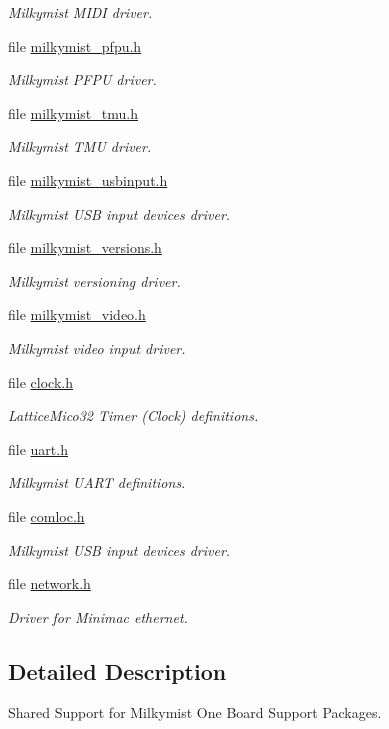 \begin{DoxyCompactItemize}
\begin{DoxyCompactList}\small\item\em Milkymist M\+I\+DI driver. \end{DoxyCompactList}\item 
file \mbox{\hyperlink{milkymist__pfpu_8h}{milkymist\+\_\+pfpu.\+h}}
\begin{DoxyCompactList}\small\item\em Milkymist P\+F\+PU driver. \end{DoxyCompactList}\item 
file \mbox{\hyperlink{milkymist__tmu_8h}{milkymist\+\_\+tmu.\+h}}
\begin{DoxyCompactList}\small\item\em Milkymist T\+MU driver. \end{DoxyCompactList}\item 
file \mbox{\hyperlink{milkymist__usbinput_8h}{milkymist\+\_\+usbinput.\+h}}
\begin{DoxyCompactList}\small\item\em Milkymist U\+SB input devices driver. \end{DoxyCompactList}\item 
file \mbox{\hyperlink{milkymist__versions_8h}{milkymist\+\_\+versions.\+h}}
\begin{DoxyCompactList}\small\item\em Milkymist versioning driver. \end{DoxyCompactList}\item 
file \mbox{\hyperlink{milkymist__video_8h}{milkymist\+\_\+video.\+h}}
\begin{DoxyCompactList}\small\item\em Milkymist video input driver. \end{DoxyCompactList}\item 
file \mbox{\hyperlink{bsps_2lm32_2shared_2milkymist__clock_2clock_8h}{clock.\+h}}
\begin{DoxyCompactList}\small\item\em Lattice\+Mico32 Timer (Clock) definitions. \end{DoxyCompactList}\item 
file \mbox{\hyperlink{lm32_2shared_2milkymist__console_2uart_8h}{uart.\+h}}
\begin{DoxyCompactList}\small\item\em Milkymist U\+A\+RT definitions. \end{DoxyCompactList}\item 
file \mbox{\hyperlink{comloc_8h}{comloc.\+h}}
\begin{DoxyCompactList}\small\item\em Milkymist U\+SB input devices driver. \end{DoxyCompactList}\item 
file \mbox{\hyperlink{network_8h}{network.\+h}}
\begin{DoxyCompactList}\small\item\em Driver for Minimac ethernet. \end{DoxyCompactList}\end{DoxyCompactItemize}


\subsection{Detailed Description}
Shared Support for Milkymist One Board Support Packages. 

